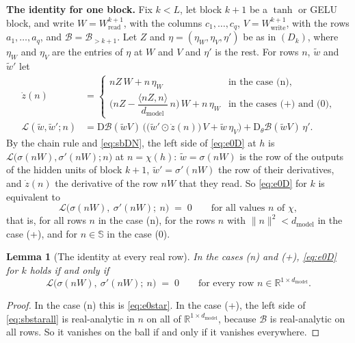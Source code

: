 \documentclass[10pt]{article}
\newtheorem{lemma}[theorem]{Lemma}
\theoremstyle{definition}
\theoremstyle{remark}
\newcommand{\R}{\mathbb{R}}
\newcommand{\Wread}{W_{\mathrm{read}}}
\newcommand{\Wwrite}{W_{\mathrm{write}}}
\newcommand{\dm}{d_{\mathrm{model}}}
\newcommand{\Der}{\mathrm{D}}
\newcommand{\norm}[1]{\lVert #1\rVert}
\newcommand{\para}[1]{\smallskip\noindent\textbf{#1}\hspace{0.5em}}
\begin{document}
\para{The identity for one block.} Fix $k < L$, let block $k+1$ be a $\tanh$ or GELU block, and write $W = \Wread^{k+1}$, with the columns $c_1, \dots, c_q$, $V = \Wwrite^{k+1}$, with the rows $a_1, \dots, a_q$, and $\mathcal B = \mathcal B_{>k+1}$. Let $Z$ and $\eta = (\eta_W, \eta_V, \eta')$ be as in $(D_k)$, where $\eta_W$ and $\eta_V$ are the entries of $\eta$ at $W$ and $V$ and $\eta'$ is the rest. For rows $n$, $\tilde w$ and $\tilde w'$ let
\begin{align}
\dot z(n) &= \begin{cases} nZ\,W + n\,\eta_W & \text{in the case (n),}\\[3pt] \Big(nZ - \dfrac{\langle nZ, n\rangle}{\dm}\,n\Big)\,W + n\,\eta_W & \text{in the cases (+) and (0),}\end{cases} \label{eq:e0zdot}\\[2pt]
\mathcal L(\tilde w, \tilde w'; n) &= \Der\mathcal B(\tilde wV)\,\Big(\big(\tilde w'\odot\dot z(n)\big)\,V + \tilde w\,\eta_V\Big) + \Der_\theta\mathcal B(\tilde wV)\,\eta' . \label{eq:e0L}
\end{align}
By the chain rule and \eqref{eq:sbDN}, the left side of \eqref{eq:e0D} at $h$ is $\mathcal L\big(\sigma(nW), \sigma'(nW); n\big)$ at $n = \chi(h)$: $\tilde w = \sigma(nW)$ is the row of the outputs of the hidden units of block $k+1$, $\tilde w' = \sigma'(nW)$ the row of their derivatives, and $\dot z(n)$ the derivative of the row $nW$ that they read. So \eqref{eq:e0D} for $k$ is equivalent to
\begin{equation}\label{eq:e0star}
\mathcal L\big(\sigma(nW),\ \sigma'(nW);\ n\big) \;=\; 0 \qquad\text{for all values } n \text{ of } \chi,
\end{equation}
that is, for all rows $n$ in the case (n), for the rows $n$ with $\norm{n}^2 < \dm$ in the case (+), and for $n \in \mathbb S$ in the case (0).

\begin{lemma}[The identity at every real row]\label{lem:sballrows}
In the cases (n) and (+), \eqref{eq:e0D} for $k$ holds if and only if
\begin{equation}\label{eq:sbstarall}
\mathcal L\big(\sigma(nW),\ \sigma'(nW);\ n\big) \;=\; 0 \qquad\text{for every row } n \in \R^{1\times\dm} .
\end{equation}
\end{lemma}

\begin{proof}
In the case (n) this is \eqref{eq:e0star}. In the case (+), the left side of \eqref{eq:sbstarall} is real-analytic in $n$ on all of $\R^{1\times\dm}$, because $\mathcal B$ is real-analytic on all rows. So it vanishes on the ball if and only if it vanishes everywhere.
\end{proof}
\end{document}
